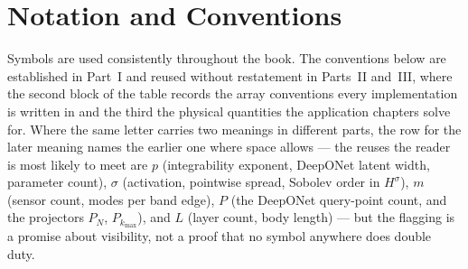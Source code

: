 \chapter*{Notation and Conventions}

Symbols are used consistently throughout the book. The conventions below are
established in Part~I and reused without restatement in Parts~II and~III, where
the second block of the table records the array conventions every implementation
is written in and the third the physical quantities the application chapters
solve for. Where the same letter carries two meanings in different parts, the row
for the later meaning names the earlier one where space allows --- the reuses the
reader is most likely to meet are $p$ (integrability exponent, DeepONet latent
width, parameter count), $\sigma$ (activation, pointwise spread, Sobolev order in
$H^\sigma$), $m$
(sensor count, modes per band edge), $P$ (the DeepONet query-point count, and the projectors $P_N$,
$P_{k_{\max}}$), and $L$ (layer count, body length) --- but the flagging is a
promise about visibility, not a proof that no symbol anywhere does double duty.

